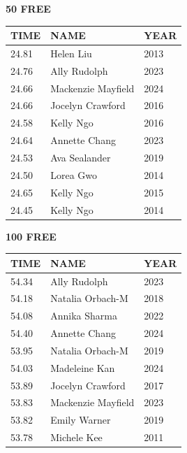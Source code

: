 \begin{table}[H]
\centering
\begin{minipage}[t]{0.48\textwidth}
\centering
\textbf{50 FREE}\\[0.1cm]
\begin{tabular}{@{}p{1.8cm}p{2.8cm}p{1.2cm}@{}}
\hline
    \textbf{TIME} & \textbf{NAME} & \textbf{YEAR} \\
\hline
    24.81 & Helen Liu & 2013 \\
    24.76 & Ally Rudolph & 2023 \\
    24.66 & Mackenzie Mayfield & 2024 \\
    24.66 & Jocelyn Crawford & 2016 \\
    24.58 & Kelly Ngo & 2016 \\
    24.64 & Annette Chang & 2023 \\
    24.53 & Ava Sealander & 2019 \\
    24.50 & Lorea Gwo & 2014 \\
    24.65 & Kelly Ngo & 2015 \\
    24.45 & Kelly Ngo & 2014 \\
\hline
\end{tabular}
\end{minipage}\hfill
\begin{minipage}[t]{0.48\textwidth}
\centering
\textbf{100 FREE}\\[0.1cm]
\begin{tabular}{@{}p{1.8cm}p{2.8cm}p{1.2cm}@{}}
\hline
    \textbf{TIME} & \textbf{NAME} & \textbf{YEAR} \\
\hline
    54.34 & Ally Rudolph & 2023 \\
    54.18 & Natalia Orbach-M & 2018 \\
    54.08 & Annika Sharma & 2022 \\
    54.40 & Annette Chang & 2024 \\
    53.95 & Natalia Orbach-M & 2019 \\
    54.03 & Madeleine Kan & 2024 \\
    53.89 & Jocelyn Crawford & 2017 \\
    53.83 & Mackenzie Mayfield & 2023 \\
    53.82 & Emily Warner & 2019 \\
    53.78 & Michele Kee & 2011 \\
\hline
\end{tabular}
\end{minipage}
\end{table}

